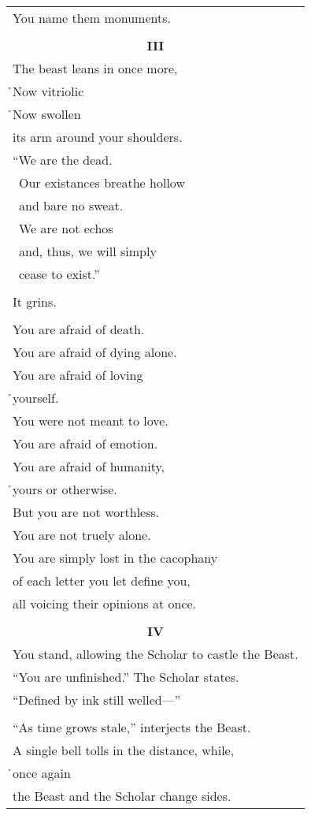 \documentclass{article}
\begin{document}
\begin{center}
\begin{longtable}{l}
You name them monuments. \\
\\
\multicolumn{1}{c}{\textbf{III}} \\
The beast leans in once more, \\
\h{}Now vitriolic \\ %
\h{}Now swollen \\
its arm around your shoulders. \\
``We are the dead. \\
\ Our existances breathe hollow \\
\ and bare no sweat. \\
\ We are not echos \\
\ and, thus, we will simply \\
\ cease to exist.'' \\
\\
It grins. \\
\\
You are afraid of death. \\
You are afraid of dying alone. \\
You are afraid of loving \\
\h{}yourself. \\
You were not meant to love. \\
You are afraid of emotion. \\
You are afraid of humanity, \\
\h{}yours or otherwise. \\
But you are not worthless. \\
You are not truely alone. \\
You are simply lost in the cacophany \\
of each letter you let define you, \\
all voicing their opinions at once. \\
\\
\multicolumn{1}{c}{\textbf{IV}} \\
You stand, allowing the Scholar to castle the Beast. \\
``You are unfinished.'' The Scholar states. \\
``Defined by ink still welled---'' \\
\\
``As time grows stale,'' interjects the Beast. \\
A single bell tolls in the distance, while, \\
\h{}once again \\
the Beast and the Scholar change sides. \\
\end{longtable}
\end{center}
\end{document}

